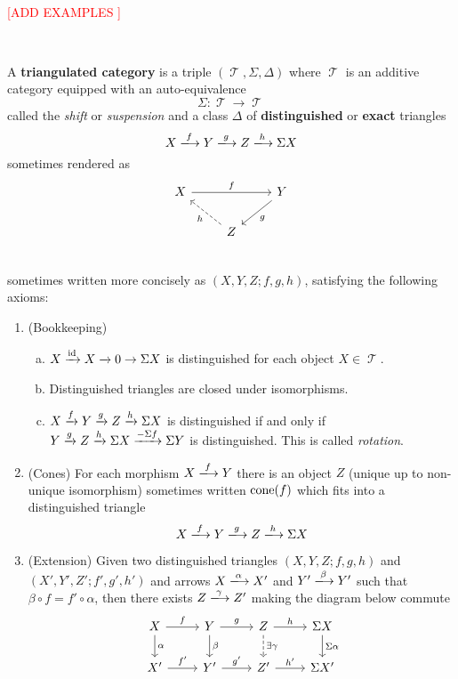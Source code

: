 \documentclass[11pt]{article}
\DeclareMathOperator{\TT}{\mathcal{T}}
\begin{document}
\

\large{\textcolor{red}{[ADD EXAMPLES ]}} \normalsize

\

\begin{defn}\label{tricat}
A \textbf{triangulated category} is a triple $(\TT,\Sigma,\Delta)$ where $\TT$ is an additive category equipped with an auto-equivalence 
\[
	\Sigma: \TT \to \TT
\] called the \textit{shift} or \textit{suspension} and a class $\Delta$ of \textbf{distinguished} or \textbf{exact} triangles
\[
	X \xlongrightarrow{f} Y \xlongrightarrow{g} Z \xlongrightarrow{h} \Sigma X
\] sometimes rendered as 
\[\begin{tikzcd}
X \ar[rr,"f"] &  & Y \ar[dl,"g"]  \\
  &  Z \ar[ul,dashed,"h"] &  \\
\end{tikzcd}\]
sometimes written more concisely as $(X,Y,Z; f,g,h)$, satisfying the following axioms:
\begin{enumerate}[TC1.]
	\item (Bookkeeping)
		\begin{enumerate}[a.]
			\item $X \xrightarrow{\operatorname{id}} X \xrightarrow{} 0 \to \Sigma X$ is distinguished for each object $X \in \TT$.
			\item Distinguished triangles are closed under isomorphisms.
			\item $X \xrightarrow{f} Y \xrightarrow{g} Z \xrightarrow{h} \Sigma X $ is distinguished if and only if $Y \xrightarrow{g} Z\xrightarrow{h} \Sigma X \xrightarrow{-\Sigma f} \Sigma Y $ is distinguished. This is called \textit{rotation}.
		\end{enumerate}
	\item (Cones) For each morphism $X \xlongrightarrow{f} Y$ there is an object $Z$ (unique up to non-unique isomorphism) sometimes written $\operatorname{cone}(f)$ which fits into a distinguished triangle 
	\[
		X \xlongrightarrow{f} Y \xlongrightarrow{g} Z \xlongrightarrow{h} \Sigma X
	\]
\item (Extension) Given two distinguished triangles $(X,Y,Z; f,g,h)$ and $(X',Y',Z'; f', g', h')$ and arrows $X \xlongrightarrow{\alpha} X'$ and $Y' \xlongrightarrow{\beta} Y'$ such that $\beta \circ f = f' \circ \alpha$, then there exists $Z \xlongrightarrow{\gamma} Z'$ making the diagram below commute
\[\begin{tikzcd}
X \ar[r,"f"] \ar[d,"\alpha"] & Y \ar[r,"g"] \ar[d,"\beta"] & Z \ar[r,"h"] \ar[d,dashed,"\exists \gamma"] & \Sigma X \ar[d,"\Sigma \alpha"]\\
X'\ar[r,"f'"] & Y' \ar[r,"g'"] & Z' \ar[r,"h'"]& \Sigma X' \\
\end{tikzcd}\]


\end{enumerate}
\end{defn}
\end{document}

